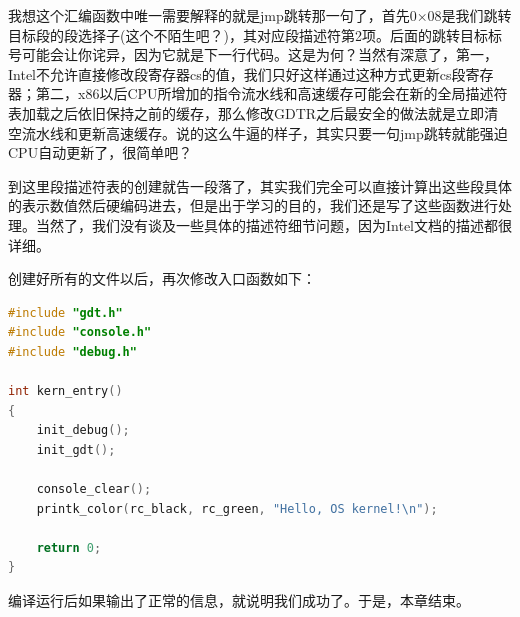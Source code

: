 \par 我想这个汇编函数中唯一需要解释的就是jmp跳转那一句了，首先0×08是我们跳转目标段的段选择子(这个不陌生吧？)，其对应段描述符第2项。后面的跳转目标标号可能会让你诧异，因为它就是下一行代码。这是为何？当然有深意了，第一，Intel不允许直接修改段寄存器cs的值，我们只好这样通过这种方式更新cs段寄存器；第二，x86以后CPU所增加的指令流水线和高速缓存可能会在新的全局描述符表加载之后依旧保持之前的缓存，那么修改GDTR之后最安全的做法就是立即清空流水线和更新高速缓存。说的这么牛逼的样子，其实只要一句jmp跳转就能强迫CPU自动更新了，很简单吧？

\par 到这里段描述符表的创建就告一段落了，其实我们完全可以直接计算出这些段具体的表示数值然后硬编码进去，但是出于学习的目的，我们还是写了这些函数进行处理。当然了，我们没有谈及一些具体的描述符细节问题，因为Intel文档的描述都很详细。

\par 创建好所有的文件以后，再次修改入口函数如下：

\begin{lstlisting}[language = C, caption = init/entry.c]
#include "gdt.h"
#include "console.h"
#include "debug.h"

int kern_entry()
{
	init_debug();
	init_gdt();

	console_clear();
	printk_color(rc_black, rc_green, "Hello, OS kernel!\n");

	return 0;
}
\end{lstlisting}

\par 编译运行后如果输出了正常的信息，就说明我们成功了。于是，本章结束。
